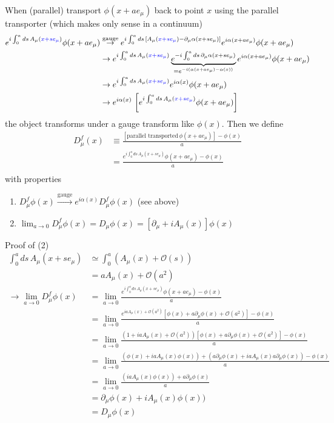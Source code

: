 \documentclass[10pt,a4paper]{article}
\theoremstyle{definition}
\begin{document}
When (parallel) transport $\phi(x+ae_\mu)$ back to point $x$ using the parallel transporter (which makes only sense in a continuum)
\begin{align}
e^{i\int_0^a ds\, A_\mu(\textcolor{blue}{x+se_\mu})}\phi(x+ae_\mu)
&\overset{\text{gauge}}{\rightarrow} e^{i\int_0^a ds\, [A_\mu(\textcolor{blue}{x+se_\mu})-\partial_\mu\alpha(x+se_\mu)]}e^{i\alpha(x+ae_\mu)}\phi(x+ae_\mu)\\
&\rightarrow e^{i\int_0^a ds\, A_\mu(\textcolor{blue}{x+se_\mu})}\underbrace{e^{-i\int_0^a ds\,\partial_\mu\alpha(x+se_\mu)}}_{=e^{-i(\alpha(x+ae_\mu)-\alpha(x))}}e^{i\alpha(x+ae_\mu)}\phi(x+ae_\mu)\\
&\rightarrow e^{i\int_0^a ds\, A_\mu(\textcolor{blue}{x+se_\mu})}e^{i\alpha(x)}\phi(x+ae_\mu)\\
&\rightarrow e^{i\alpha(x)}\,\left[e^{i\int_0^a ds\, A_\mu(\textcolor{blue}{x+se_\mu})}\phi(x+ae_\mu)\right]
\end{align}
the object transforms under a gauge transform like $\phi(x)$. Then we define
\begin{align}
D_\mu^f(x)
&\equiv\frac{[\text{parallel transported}\,\phi(x+ae_\mu)]-\phi(x) }{a}\\
&=\frac{e^{i\int_0^a ds\, A_\mu(x+se_\mu)}\phi(x+ae_\mu)-\phi(x) }{a}\\
\end{align}
with properties
\begin{enumerate}[(1)]
\item $D_\mu^f\phi(x)\overset{\text{gauge}}{\rightarrow}e^{i\alpha(x)}D_\mu^f\phi(x)$ (see above)
\item $\lim_{a\rightarrow0}D_\mu^f\phi(x)=D_\mu\phi(x)=[\partial_\mu+iA_\mu(x)]\phi(x)$
\end{enumerate}
Proof of (2)
\begin{align}
\int_0^a ds\,A_\mu(x+se_\mu)&\simeq\int_0^a\left(A_\mu(x)+\mathcal{O}(s)\right)\\
&=aA_\mu(x)+\mathcal{O}(a^2)\\
\rightarrow \lim_{a\rightarrow0}D_\mu^f\phi(x)
&=\lim_{a\rightarrow0}\frac{e^{i\int_0^a ds\, A_\mu(x+se_\mu)}\phi(x+ae_\mu)-\phi(x)}{a}\\
&=\lim_{a\rightarrow0}\frac{e^{iaA_\mu(x)+\mathcal{O}(a^2)}[\phi(x)+a\partial_\mu\phi(x)+\mathcal{O}(a^2)]-\phi(x)}{a}\\
&=\lim_{a\rightarrow0}\frac{(1+iaA_\mu(x)+\mathcal{O}(a^2))[\phi(x)+a\partial_\mu\phi(x)+\mathcal{O}(a^2)]-\phi(x)}{a}\\
&=\lim_{a\rightarrow0}\frac{(\phi(x)+iaA_\mu(x)\phi(x))+(a\partial_\mu\phi(x)+iaA_\mu(x)a\partial_\mu\phi(x))-\phi(x)}{a}\\
&=\lim_{a\rightarrow0}\frac{(iaA_\mu(x)\phi(x))+a\partial_\mu\phi(x)}{a}\\
&=\partial_\mu\phi(x)+iA_\mu(x)\phi(x))\\
&=D_\mu\phi(x)
\end{align}
\end{document}
